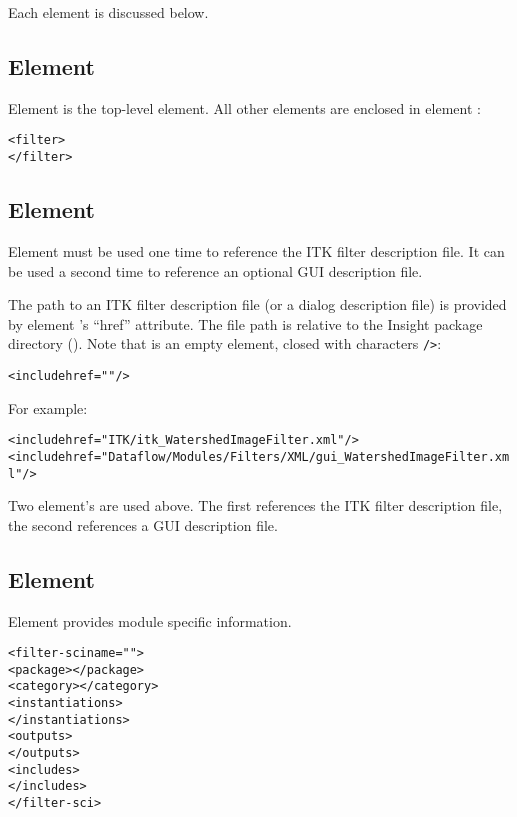 Each element is discussed below.


\subsection{Element }

Element  is the top-level element.  All other
elements are enclosed in element :

\begin{alltt}
  <filter>
  \velide
  </filter>
\end{alltt}

\subsection{Element }

Element  must be used one time to reference the
ITK filter description file.  It can be used a second time to
reference an optional GUI description file.

The path to an ITK filter description file (or a dialog description
file) is provided by element 's ``href''
attribute.  The file path is relative to the  \sr{} Insight
package directory ().  Note that
 is an empty element, closed with
characters \verb|/>|:

\begin{alltt}
  <include href=""/>
\end{alltt}

For example:

\begin{alltt}
  <include href="ITK/itk_WatershedImageFilter.xml"/>
  <include href="Dataflow/Modules/Filters/XML/gui_WatershedImageFilter.xml"/>
\end{alltt}

Two  element's are used above.  The first
references the ITK filter description file, the second references a
GUI description file.


\subsection{Element }

Element  provides module specific information.

\begin{alltt}
  <filter-sci name="">
    <package></package>
    <category></category>
    <instantiations>
    \velide
    </instantiations>
    <outputs>
    \velide
    </outputs>
    <includes>
    \velide
    </includes>
  </filter-sci>
\end{alltt}


